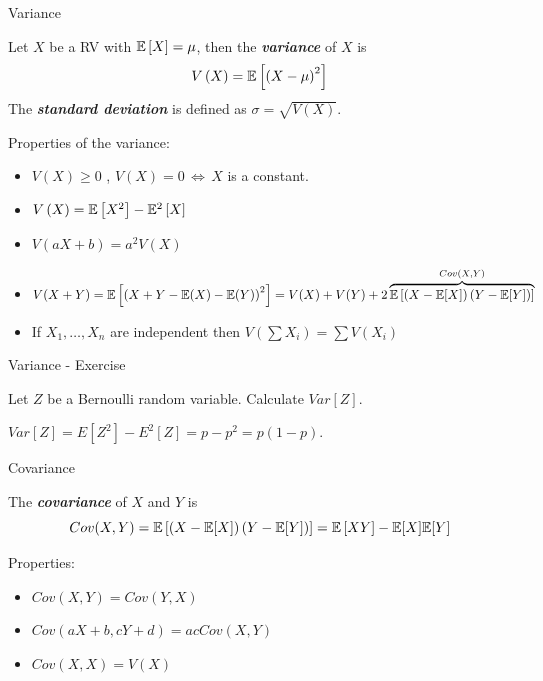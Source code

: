 \documentclass[11pt, usenames, dvipsnames]{beamer}
\begin{document}
\begin{frame}{Variance}

\begin{definition}[Variance]
Let $X$ be a RV with $\mathbb{E}\left[X\right]=\mu$, then the \textbf{\textit{variance}}
of $X$ is 
$$V\left(X\right)=\mathbb{E}\left[\left(X-\mu\right)^{2}\right]$$
The \textbf{\textit{standard deviation}} is defined as $\sigma=\sqrt{V\left(X\right)}$.
\end{definition}
\pause

Properties of the variance:
\begin{itemize}
\item $V(X)\geq0$ , $V(X)=0\,\iff\,X$ is a constant.
\pause
\item $V\left(X\right)=\mathbb{E}\left[X^{2}\right]-\mathbb{E}^{2}\left[X\right]$
\pause
\item $V(aX+b)=a^{2}V(X)$
\pause
\item $V(X+Y)=\mathbb{E}\left[\left(X+Y-\mathbb{E}(X)-\mathbb{E}(Y)\right)^{2}\right]=V(X)+V(Y)+2\overbrace{\mathbb{E}\left[\left(X-\mathbb{E}[X]\right)\left(Y-\mathbb{E}[Y]\right)\right]}^{Cov\left(X,Y\right)}$
\pause
\item If $X_{1},\dots,X_{n}$ are independent then $V\left(\sum X_{i}\right)=\sum V\left(X_{i}\right)$\end{itemize}


\end{frame}

\begin{frame}{Variance - Exercise}
\begin{exercise}
Let $Z$ be a Bernoulli random variable. Calculate $Var[Z].$ 
\end{exercise}
\pause
\begin{solution}
$Var[Z]=E[Z^2]-E^2[Z]=p-p^2=p(1-p).$
\end{solution}
\end{frame}

\begin{frame}{Covariance}

\begin{definition}[Covariance]
The \textbf{\textit{covariance}} of $X$ and $Y$ is
\[
Cov(X,Y)=\mathbb{E}\left[\left(X-\mathbb{E}[X]\right)\left(Y-\mathbb{E}[Y]\right)\right]=\mathbb{E}\left[XY\right]-\mathbb{E}[X]\mathbb{E}[Y]
\]

\end{definition}

\pause
Properties:
\begin{itemize}
\item $Cov(X,Y)=Cov(Y,X)$
\pause
\item $Cov(aX+b,cY+d)=acCov(X,Y)$
\pause
\item $Cov(X,X)=V(X)$
\end{itemize}
    
\end{frame}
\end{document}
